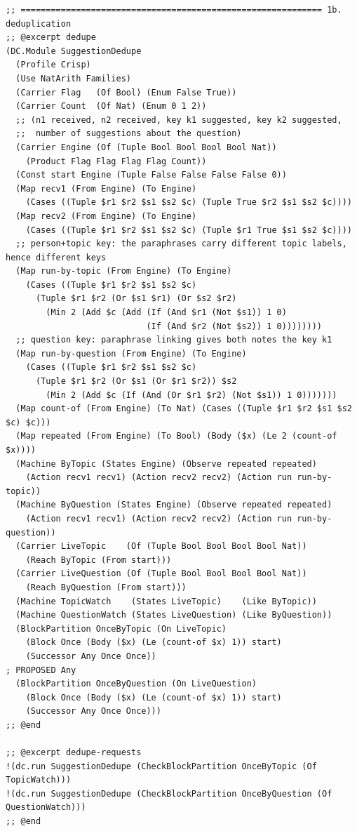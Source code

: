 \documentclass[11pt]{article}
\theoremstyle{definition}
\theoremstyle{plain}
\begin{document}
\begin{lstlisting}[style=mettafull]
;; ============================================================ 1b. deduplication
;; @excerpt dedupe
(DC.Module SuggestionDedupe
  (Profile Crisp)
  (Use NatArith Families)
  (Carrier Flag   (Of Bool) (Enum False True))
  (Carrier Count  (Of Nat) (Enum 0 1 2))
  ;; (n1 received, n2 received, key k1 suggested, key k2 suggested,
  ;;  number of suggestions about the question)
  (Carrier Engine (Of (Tuple Bool Bool Bool Bool Nat))
    (Product Flag Flag Flag Flag Count))
  (Const start Engine (Tuple False False False False 0))
  (Map recv1 (From Engine) (To Engine)
    (Cases ((Tuple $r1 $r2 $s1 $s2 $c) (Tuple True $r2 $s1 $s2 $c))))
  (Map recv2 (From Engine) (To Engine)
    (Cases ((Tuple $r1 $r2 $s1 $s2 $c) (Tuple $r1 True $s1 $s2 $c))))
  ;; person+topic key: the paraphrases carry different topic labels, hence different keys
  (Map run-by-topic (From Engine) (To Engine)
    (Cases ((Tuple $r1 $r2 $s1 $s2 $c)
      (Tuple $r1 $r2 (Or $s1 $r1) (Or $s2 $r2)
        (Min 2 (Add $c (Add (If (And $r1 (Not $s1)) 1 0)
                            (If (And $r2 (Not $s2)) 1 0))))))))
  ;; question key: paraphrase linking gives both notes the key k1
  (Map run-by-question (From Engine) (To Engine)
    (Cases ((Tuple $r1 $r2 $s1 $s2 $c)
      (Tuple $r1 $r2 (Or $s1 (Or $r1 $r2)) $s2
        (Min 2 (Add $c (If (And (Or $r1 $r2) (Not $s1)) 1 0)))))))
  (Map count-of (From Engine) (To Nat) (Cases ((Tuple $r1 $r2 $s1 $s2 $c) $c)))
  (Map repeated (From Engine) (To Bool) (Body ($x) (Le 2 (count-of $x))))
  (Machine ByTopic (States Engine) (Observe repeated repeated)
    (Action recv1 recv1) (Action recv2 recv2) (Action run run-by-topic))
  (Machine ByQuestion (States Engine) (Observe repeated repeated)
    (Action recv1 recv1) (Action recv2 recv2) (Action run run-by-question))
  (Carrier LiveTopic    (Of (Tuple Bool Bool Bool Bool Nat))
    (Reach ByTopic (From start)))
  (Carrier LiveQuestion (Of (Tuple Bool Bool Bool Bool Nat))
    (Reach ByQuestion (From start)))
  (Machine TopicWatch    (States LiveTopic)    (Like ByTopic))
  (Machine QuestionWatch (States LiveQuestion) (Like ByQuestion))
  (BlockPartition OnceByTopic (On LiveTopic)
    (Block Once (Body ($x) (Le (count-of $x) 1)) start)
    (Successor Any Once Once))                                          ; PROPOSED Any
  (BlockPartition OnceByQuestion (On LiveQuestion)
    (Block Once (Body ($x) (Le (count-of $x) 1)) start)
    (Successor Any Once Once)))
;; @end

;; @excerpt dedupe-requests
!(dc.run SuggestionDedupe (CheckBlockPartition OnceByTopic (Of TopicWatch)))
!(dc.run SuggestionDedupe (CheckBlockPartition OnceByQuestion (Of QuestionWatch)))
;; @end


\end{lstlisting}
\end{document}
